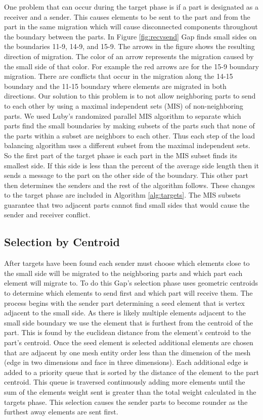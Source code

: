\documentclass{thesis}
\begin{document}
One problem that can occur during the target phase is if a part is 
designated as a receiver and a sender. This causes elements to be sent 
to the part and from the part in the same migration which will cause 
disconnected components throughout the boundary between the parts. In Figure 
\ref{fig:recvsend} Gap finds small sides on the boundaries 11-9, 14-9, and 15-9.
The arrows in the figure shows the resulting direction of migration. The color 
of an arrow represents the migration caused by the small side of that color. 
For example the red arrows are for the 15-9 boundary migration. There are 
conflicts that occur in the migration along the 14-15 boundary and the 11-15 
boundary where elements are migrated in both directions.  Our solution to this 
problem is to not allow neighboring parts to send to each other by using a 
maximal independent sets (MIS) of non-neighboring parts. We used Luby's 
randomized parallel MIS algorithm \cite{luby} to separate which parts find the 
small boundaries by making subsets of the parts such that none of the parts 
within a subset are neighbors to each other. Thus each step of the load 
balancing algorithm uses a different subset from the maximal independent sets. 
So the first part of the target phase is each part in the MIS subset 
finds its smallest side. If this side is less than the percent of the average 
side length then it sends a message to the part on the other side of the 
boundary. This other part then determines the senders and the rest of the 
algorithm follows. These changes to the target phase are included in Algorithm 
\ref{alg:targets}. The MIS subsets guarantee that two adjacent parts cannot 
find small sides that would cause the sender and receiver conflict. 



\subsection{Selection by Centroid}
After targets have been found each sender must choose which elements close 
to the small side will be migrated to the neighboring parts and which part 
each element will migrate to. To do this Gap's selection phase uses geometric 
centroids to determine which elements to send first and which part will 
receive them. The process begins with the sender part determining a seed 
element that is vertex adjacent to the small side. As there is likely 
multiple elements adjacent to the small side boundary we use the element 
that is furthest from the centroid of the part. This is found by the euclidean 
distance from the element's centroid to the part's centroid. Once the seed 
element is selected additional elements are chosen that 
are adjacent by one mesh entity order less than the dimension of the mesh 
(edge in two dimensions and face in three dimensions). Each additional edge 
is added to a priority queue that is sorted by the distance of the element 
to the part centroid. This queue is traversed continuously adding more 
elements until the sum of the elements weight sent is greater than the total 
weight calculated in the targets phase. This selection causes the sender 
parts to become rounder as the furthest away elements are sent first.
\end{document}
